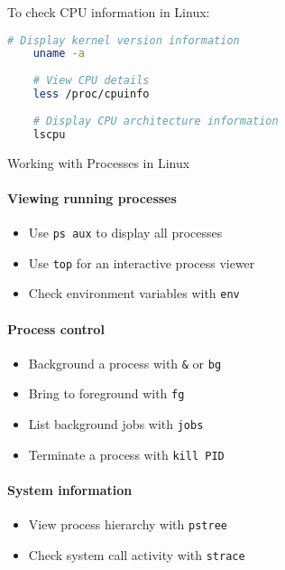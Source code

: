 \begin{example}
    To check CPU information in Linux:
    \begin{lstlisting}[language=bash, style=basesmol]
    # Display kernel version information
    uname -a
    
    # View CPU details
    less /proc/cpuinfo
    
    # Display CPU architecture information
    lscpu
    \end{lstlisting}
\end{example}

\begin{KR}{Working with Processes in Linux}
    \paragraph{Viewing running processes}
    \begin{itemize}
        \item Use \texttt{ps aux} to display all processes
        \item Use \texttt{top} for an interactive process viewer
        \item Check environment variables with \texttt{env}
    \end{itemize}
    
    \paragraph{Process control}
    \begin{itemize}
        \item Background a process with \texttt{\&} or \texttt{bg}
        \item Bring to foreground with \texttt{fg}
        \item List background jobs with \texttt{jobs}
        \item Terminate a process with \texttt{kill PID}
    \end{itemize}
    
    \paragraph{System information}
    \begin{itemize}
        \item View process hierarchy with \texttt{pstree}
        \item Check system call activity with \texttt{strace}
    \end{itemize}
\end{KR}

